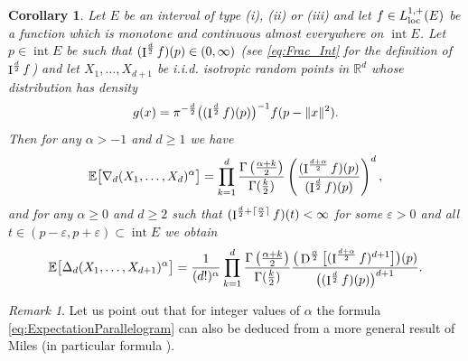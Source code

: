 \documentclass[11pt,a4paper]{article}
\theoremstyle{plain}
\newtheorem{corollary}[theorem]{Corollary}
\theoremstyle{definition}
\theoremstyle{remark}
\newtheorem{remark}[theorem]{Remark}
\def\EE{\mathbb{E}}
\def\RR{\mathbb{R}}
\newcommand{\frI}{\mathop{\mathrm{I}}\nolimits}
\newcommand{\frD}{\mathop{\mathrm{D}}\nolimits}
\newcommand{\inter}{\operatorname{int}}
\begin{document}
\begin{corollary}\label{cor:RandomSimplexVolume}
    Let $E$ be an interval of type (i), (ii) or (iii) and let $f\in L_{\rm loc}^{1,+}(E)$ be a function which is monotone and continuous almost everywhere on $\inter E$. Let $p\in \inter E$ be such that $(\frI^{d\over 2}f)(p)\in (0,\infty)$ {(see \eqref{eq:Frac_Int} for the definition of $\frI^{d\over 2}f$)} and let $X_1,\ldots,X_{d+1}$ be i.i.d. isotropic random points in $\RR^d$ whose distribution has density 
    $$
        g(x)=\pi^{-{d\over 2}}\big((\frI^{d\over 2}f)(p)\big)^{-1}f(p-\|x\|^2).
    $$
    Then for any $\alpha>-1$ and $d\ge 1$ we have
    \begin{equation}\label{eq:ExpectationParallelogram}
        \EE \big[\nabla_d(X_1,\ldots,X_{d})^{\alpha}\big]=\prod_{k=1}^{d}\frac{\Gamma\left(\frac{\alpha+k}{2}\right)}{\Gamma(\frac{k}{2})} \left({(\frI^{\frac{d+\alpha}{2}}f)(p)\over (\frI^{d\over 2}f)(p)}\right)^d,
    \end{equation}
    and for any $\alpha\ge 0$ and $d\ge 2$ such that $(\frI^{{d\over 2}+\lceil{\alpha\over 2}\rceil}f)(t)<\infty$ for some $\varepsilon>0$ and all $t\in (p-\varepsilon,p+\varepsilon)\subset\inter E$ we obtain
    \begin{equation}\label{eq:ExpectationSimplex}
        \EE \big[\Delta_d(X_1,\ldots,X_{d+1})^{\alpha}\big]=\frac{1}{(d!)^\alpha} \prod_{k=1}^{d}\frac{\Gamma\left(\frac{\alpha+k}{2}\right)}{\Gamma(\frac{k}{2})}{\big(\frD^{\frac{\alpha}{2}}\big[(\frI^{\frac{d+\alpha}{2}}f)^{d+1}\big]\big)(p)\over \big((\frI^{d\over 2}f)(p)\big)^{d+1}}.
    \end{equation}
\end{corollary}

\begin{remark}
    Let us point out that for integer values of $\alpha$ the formula \eqref{eq:ExpectationParallelogram} can also be deduced from a more general result of Miles \cite[Theorem 1]{Miles_IRS} (in particular formula \cite[Equation (23)]{Miles_IRS}).
\end{remark}
\end{document}
